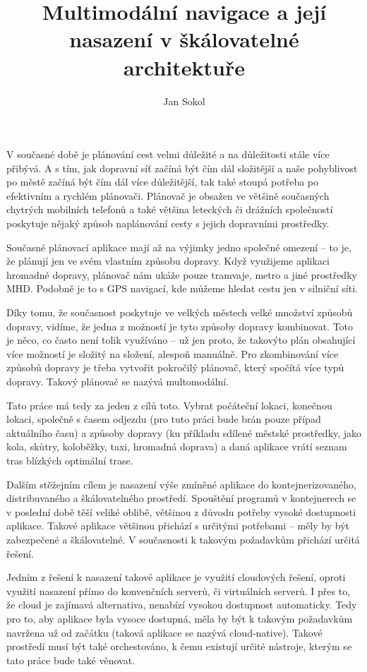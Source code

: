 \documentclass[thesis=M,czech]{FITthesis}[2019/12/23]
\title{Multimodální navigace a její nasazení v škálovatelné architektuře}
\author{Jan Sokol} %
\theoremstyle{plain}
\theoremstyle{definition}
\begin{document}

\begin{introduction}
V současné době je plánování cest velmi důležité a na důležitosti stále více přibývá. A s tím, jak dopravní síť začíná být čím dál složitější a naše pohyblivost po městě začíná být čím dál více důležitější, tak také stoupá potřeba po efektivním a rychlém plánovači. Plánovač je obsažen ve většině současných chytrých mobilních telefonů a také většina leteckých či drážních společností poskytuje nějaký způsob naplánování cesty s jejich dopravními prostředky. 

Současné plánovací aplikace mají až na výjimky jedno společné omezení -- to je, že plánují jen ve svém vlastním způsobu dopravy. Když využijeme aplikaci hromadné dopravy, plánovač nám ukáže pouze tramvaje, metro a jiné prostředky MHD. Podobně je to s GPS navigací, kde můžeme hledat cestu jen v silniční síti. 

Díky tomu, že současnost poskytuje ve velkých městech velké množství způsobů dopravy, vidíme, že jedna z možností je tyto způsoby dopravy kombinovat. Toto je něco, co často není tolik využíváno -- už jen proto, že takovýto plán obsahující více možností je složitý na složení, alespoň manuálně. Pro zkombinování více způsobů dopravy je třeba vytvořit pokročilý plánovač, který spočítá více typů dopravy. Takový plánovač se nazývá multomodální.

Tato práce má tedy za jeden z cílů toto. Vybrat počáteční lokaci, konečnou lokaci, společně s časem odjezdu (pro tuto práci bude brán pouze případ aktuálního času)  a způsoby dopravy (ku příkladu sdílené městské prostředky, jako kola, skůtry, koloběžky, taxi, hromadná doprava) a daná aplikace vrátí seznam tras blízkých optimální trase. 

Dalším stěžejním cílem je nasazení výše zmíněné aplikace do kontejnerizovaného, distribuvaného a škálovatelného prostředí. Spouštění programů v kontejnerech se v poslední době těší veliké oblibě, většinou z důvodu potřeby vysoké dostupnosti aplikace. Takové aplikace většinou přichází s určitými potřebami -- měly by  být zabezpečené a  škálovatelné. V současnosti k takovým požadavkům přichází určitá řešení. 

Jedním z řešení k nasazení takové aplikace je využití cloudových řešení, oproti využití nasazení přímo do konvenčních serverů, či virtuálních serverů. I přes to, že cloud je zajímavá alternativa, nenabízí vysokou dostupnost automaticky. Tedy pro to, aby aplikace byla vysoce dostupná, měla by být k takovým požadavkům navržena už od začátku (taková aplikace se nazývá cloud-native). Takové prostředí musí být také orchestováno, k čemu existují určité nástroje, kterým se tato práce bude také věnovat. 


\end{introduction}
\end{document}
